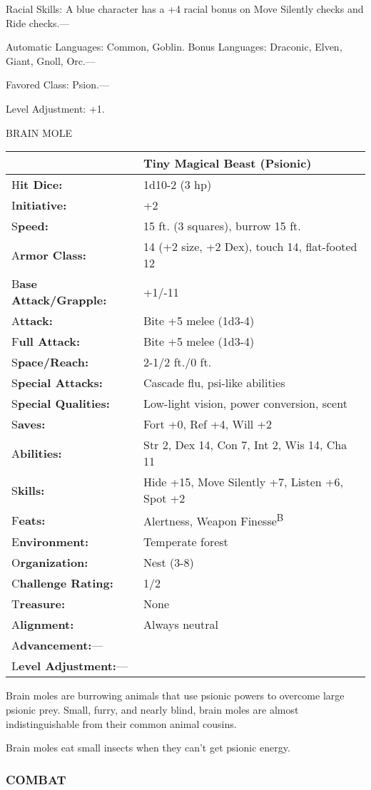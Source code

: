 \documentclass{article}
\begin{document}
\parindent=3pt
Racial Skills: A blue character has a +4 racial bonus on Move Silently checks and 
Ride checks.---

\parindent=0pt
Automatic Languages: Common, Goblin. Bonus Languages: Draconic, Elven, Giant, Gnoll, 
Orc.---

Favored Class: Psion.---

Level Adjustment: +1.

\vspace{12pt}
{\LARGE{}BRAIN MOLE}

\begin{tabular}{|>{\raggedright}p{91pt}|>{\raggedright}p{191pt}|}
\hline
  & Tiny Magical Beast (Psionic)\tabularnewline
\hline
H\textbf{it Dice:} & 1d10-2 (3 hp)\tabularnewline
\hline
I\textbf{nitiative:} & +2\tabularnewline
\hline
S\textbf{peed:} & 15 ft. (3 squares), burrow 15 ft.\tabularnewline
\hline
A\textbf{rmor Class:} & 14 (+2 size, +2 Dex), touch 14, flat-footed 12\tabularnewline
\hline
B\textbf{ase Attack/Grapple:} & +1/-11\tabularnewline
\hline
A\textbf{ttack:} & Bite +5 melee (1d3-4)\tabularnewline
\hline
F\textbf{ull Attack:} & Bite +5 melee (1d3-4)\tabularnewline
\hline
S\textbf{pace/Reach:} & 2-1/2 ft./0 ft.\tabularnewline
\hline
S\textbf{pecial Attacks:} & Cascade flu, psi-like abilities\tabularnewline
\hline
S\textbf{pecial Qualities:} & Low-light vision, power conversion, scent\tabularnewline
\hline
S\textbf{aves:} & Fort +0, Ref +4, Will +2\tabularnewline
\hline
A\textbf{bilities:} & Str 2, Dex 14, Con 7, Int 2, Wis 14, Cha 11\tabularnewline
\hline
S\textbf{kills:} & Hide +15, Move Silently +7, Listen +6, Spot +2\tabularnewline
\hline
F\textbf{eats:} & Alertness, Weapon Finesse\textsuperscript{B}\tabularnewline
\hline
E\textbf{nvironment:} & Temperate forest\tabularnewline
\hline
O\textbf{rganization:} & Nest (3-8)\tabularnewline
\hline
C\textbf{hallenge Rating:} & 1/2\tabularnewline
\hline
T\textbf{reasure:} & None\tabularnewline
\hline
A\textbf{lignment:} & Always neutral\tabularnewline
\hline
A\textbf{dvancement:}--- & \tabularnewline
\hline
L\textbf{evel Adjustment:}--- & \tabularnewline
\hline
\end{tabular}

Brain moles are burrowing animals that use psionic powers to overcome large psionic 
prey. Small, furry, and nearly blind, brain moles are almost indistinguishable 
from their common animal cousins.

Brain moles eat small insects when they can't get psionic energy.

\subsubsection*{COMBAT}
\end{document}
